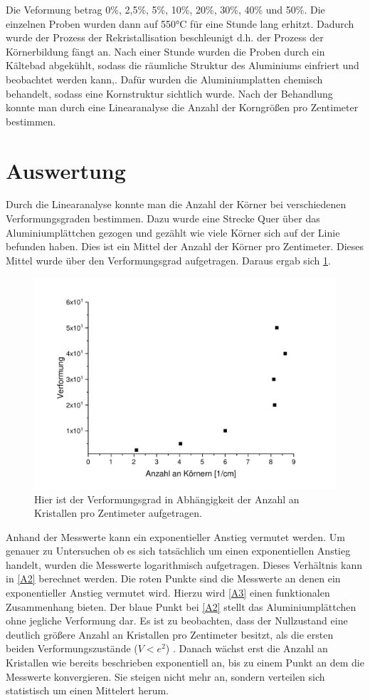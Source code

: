 \documentclass[
	a4paper,
	12pt,
	pagesize,
	ngerman
]{scrartcl}
\begin{document}
Die Veformung betrag 0\%, 2,5\%, 5\%, 10\%, 20\%, 30\%, 40\% und 50\%.
Die einzelnen Proben wurden dann auf 550°C für eine Stunde lang erhitzt. Dadurch wurde der Prozess der Rekristallisation beschleunigt d.h. der Prozess der Körnerbildung fängt an. Nach einer Stunde wurden die Proben durch ein Kältebad abgekühlt, sodass die räumliche Struktur des Aluminiums einfriert und beobachtet werden kann,. Dafür wurden die Aluminiumplatten chemisch behandelt, sodass eine Kornstruktur sichtlich wurde. Nach der Behandlung konnte man durch eine Linearanalyse die Anzahl der Korngrößen pro Zentimeter bestimmen.

\section{Auswertung}
Durch die Linearanalyse konnte man die Anzahl der Körner bei verschiedenen Verformungsgraden bestimmen. Dazu wurde eine Strecke Quer über das Aluminiumplättchen gezogen und gezählt wie viele Körner sich auf der Linie befunden haben. Dies ist ein Mittel der Anzahl der Körner pro Zentimeter. 
Dieses Mittel wurde über den Verformungsgrad aufgetragen.
Daraus ergab sich \cref{A1}.
\begin{figure}[h!]
    \centering
    \includegraphics[scale = 0.6]{A1.pdf}
    \caption{Hier ist der Verformungsgrad in Abhängigkeit der Anzahl an Kristallen pro Zentimeter aufgetragen.}
    \label{A1}
\end{figure}
Anhand der Messwerte kann ein exponentieller Anstieg vermutet werden. Um genauer zu Untersuchen ob es sich tatsächlich um einen exponentiellen Anstieg handelt, wurden die Messwerte logarithmisch aufgetragen. Dieses Verhältnis kann in \cref{A2} berechnet werden. Die roten Punkte sind die Messwerte an denen ein exponentieller Anstieg vermutet wird. Hierzu wird \cref{A3} einen funktionalen Zusammenhang bieten. Der blaue Punkt bei \cref{A2} stellt das Aluminiumplättchen ohne jegliche Verformung dar. Es ist zu beobachten, dass der Nullzustand eine deutlich größere Anzahl an Kristallen pro Zentimeter besitzt, als die ersten beiden Verformungszustände ($V<e^2$) . Danach wächst erst die Anzahl an Kristallen wie bereits beschrieben exponentiell an, bis zu einem Punkt an dem die Messwerte konvergieren. Sie steigen nicht mehr an, sondern verteilen sich statistisch um einen Mittelert herum.
\end{document}
